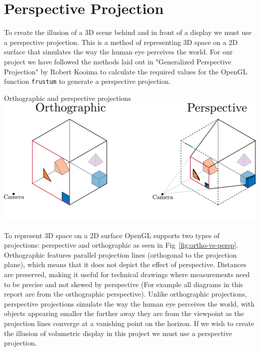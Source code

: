 \section{Perspective Projection}

To create the illusion of a 3D scene behind and in front of a display we must use a perspective projection. This is a method of representing 3D space on a 2D surface that simulates the way the human eye perceives the world. For our project we have followed the methods laid out in "Generalized Perspective Projection" by Robert Kooima \cite{kooima2009generalized} to calculate the required values for the OpenGL function \texttt{frustum} to generate a perspective projection.

\begin{figureBox}[label={fig:ortho-vs-persp}, width=0.75\linewidth]{Orthographic and perspective projections}
    \includegraphics[width = 0.8\linewidth]{./background/figures/projection/ortho-vs-persp.pdf}
\end{figureBox}

To represent 3D space on a 2D surface OpenGL supports two types of projections: perspective and orthographic as seen in Fig~\ref{fig:ortho-vs-persp}. Orthographic features parallel projection lines (orthogonal to the projection plane), which means that it does not depict the effect of perspective. Distances are preserved, making it useful for technical drawings where measurements need to be precise and not skewed by perspective (For example all diagrams in this report are from the orthographic perspective). Unlike orthographic projections, perspective projections simulate the way the human eye perceives the world, with objects appearing smaller the further away they are from the viewpoint as the projection lines converge at a vanishing point on the horizon. If we wish to create the illusion of volumetric display in this project we must use a perspective projection. \\


